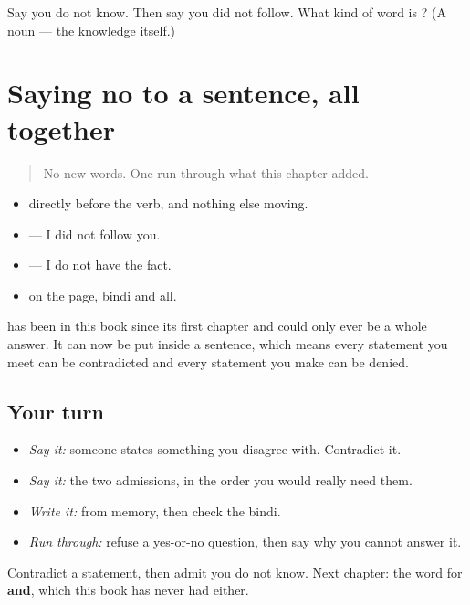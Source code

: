 \begin{tcolorbox}[breakable,colback=teal!4,colframe=teal!35!black,title={Before you move on}]
Say you do not know. Then say you did not follow. What kind of word is \textbf{}? (A noun — the knowledge itself.)
\end{tcolorbox}
\section[Practice]{Saying no to a sentence, all together}

\label{lesson:PA-C37-nahin-checkpoint}



\begin{quote}
No new words. One run through what this chapter added.
\end{quote}

\begin{grammarlens}[title={What you've built}]
\begin{itemize}
\raggedright
  \item \textbf{} directly before the verb, and nothing else moving.
  \item \textbf{   } — I did not follow you.
  \item \textbf{  } — I do not have the fact.
  \item \textbf{} on the page, bindi and all.
\end{itemize}

\textbf{} has been in this book since its first chapter and could only ever be a whole answer. It can now be put inside a sentence, which means every statement you meet can be contradicted and every statement you make can be denied.
\end{grammarlens}

\subsection*{Your turn}
\begin{itemize}
\raggedright
  \item \emph{Say it:} someone states something you disagree with. Contradict it.
  \item \emph{Say it:} the two admissions, in the order you would really need them.
  \item \emph{Write it:} \textbf{} from memory, then check the bindi.
  \item \emph{Run through:} refuse a yes-or-no question, then say why you cannot answer it.
\end{itemize}

\begin{tcolorbox}[breakable,colback=teal!4,colframe=teal!35!black,title={Before you move on}]
Contradict a statement, then admit you do not know. Next chapter: the word for \textbf{and}, which this book has never had either.
\end{tcolorbox}
